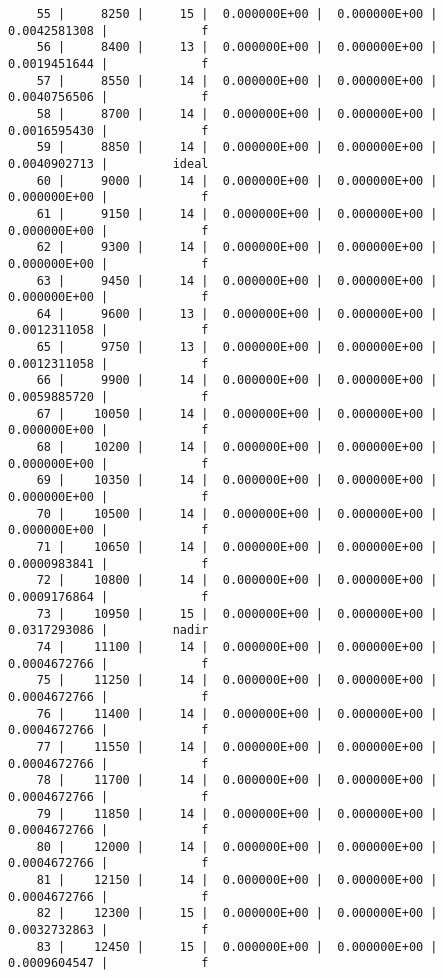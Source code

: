 \documentclass[
  authoryear,
  preprint,
  3p]{elsarticle}
\begin{document}
\begin{verbatim}
    55 |     8250 |     15 |  0.000000E+00 |  0.000000E+00 |  0.0042581308 |             f
    56 |     8400 |     13 |  0.000000E+00 |  0.000000E+00 |  0.0019451644 |             f
    57 |     8550 |     14 |  0.000000E+00 |  0.000000E+00 |  0.0040756506 |             f
    58 |     8700 |     14 |  0.000000E+00 |  0.000000E+00 |  0.0016595430 |             f
    59 |     8850 |     14 |  0.000000E+00 |  0.000000E+00 |  0.0040902713 |         ideal
    60 |     9000 |     14 |  0.000000E+00 |  0.000000E+00 |  0.000000E+00 |             f
    61 |     9150 |     14 |  0.000000E+00 |  0.000000E+00 |  0.000000E+00 |             f
    62 |     9300 |     14 |  0.000000E+00 |  0.000000E+00 |  0.000000E+00 |             f
    63 |     9450 |     14 |  0.000000E+00 |  0.000000E+00 |  0.000000E+00 |             f
    64 |     9600 |     13 |  0.000000E+00 |  0.000000E+00 |  0.0012311058 |             f
    65 |     9750 |     13 |  0.000000E+00 |  0.000000E+00 |  0.0012311058 |             f
    66 |     9900 |     14 |  0.000000E+00 |  0.000000E+00 |  0.0059885720 |             f
    67 |    10050 |     14 |  0.000000E+00 |  0.000000E+00 |  0.000000E+00 |             f
    68 |    10200 |     14 |  0.000000E+00 |  0.000000E+00 |  0.000000E+00 |             f
    69 |    10350 |     14 |  0.000000E+00 |  0.000000E+00 |  0.000000E+00 |             f
    70 |    10500 |     14 |  0.000000E+00 |  0.000000E+00 |  0.000000E+00 |             f
    71 |    10650 |     14 |  0.000000E+00 |  0.000000E+00 |  0.0000983841 |             f
    72 |    10800 |     14 |  0.000000E+00 |  0.000000E+00 |  0.0009176864 |             f
    73 |    10950 |     15 |  0.000000E+00 |  0.000000E+00 |  0.0317293086 |         nadir
    74 |    11100 |     14 |  0.000000E+00 |  0.000000E+00 |  0.0004672766 |             f
    75 |    11250 |     14 |  0.000000E+00 |  0.000000E+00 |  0.0004672766 |             f
    76 |    11400 |     14 |  0.000000E+00 |  0.000000E+00 |  0.0004672766 |             f
    77 |    11550 |     14 |  0.000000E+00 |  0.000000E+00 |  0.0004672766 |             f
    78 |    11700 |     14 |  0.000000E+00 |  0.000000E+00 |  0.0004672766 |             f
    79 |    11850 |     14 |  0.000000E+00 |  0.000000E+00 |  0.0004672766 |             f
    80 |    12000 |     14 |  0.000000E+00 |  0.000000E+00 |  0.0004672766 |             f
    81 |    12150 |     14 |  0.000000E+00 |  0.000000E+00 |  0.0004672766 |             f
    82 |    12300 |     15 |  0.000000E+00 |  0.000000E+00 |  0.0032732863 |             f
    83 |    12450 |     15 |  0.000000E+00 |  0.000000E+00 |  0.0009604547 |             f

\end{verbatim}
\end{document}

